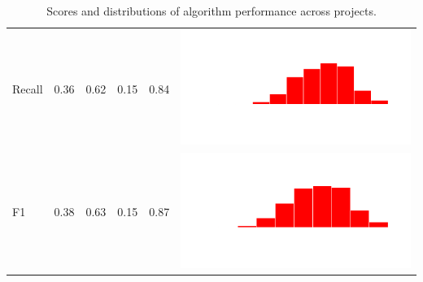\documentclass[conference]{IEEEtran}
\begin{document}
\begin{table}
\begin{tabular}{lrrrrc}
    Recall & 0.36 & 0.62 & 0.15 & 0.84 & \includegraphics[scale = 0.1, clip = true, trim= 50px 60px 50px 60px]{../figs/hist-results/hist-RFrec.pdf} \\
    F1 & 0.38 & 0.63 & 0.15 & 0.87 & \includegraphics[scale = 0.1, clip = true, trim= 50px 60px 50px 60px]{../figs/hist-results/hist-RFf1.pdf} \\
    \hline
  \end{tabular}
  \caption[Comparision of algorithms]{Scores and distributions of algorithm performance across projects.}
  \label{tab:alg-compare}
\end{table}

%
\end{document}

